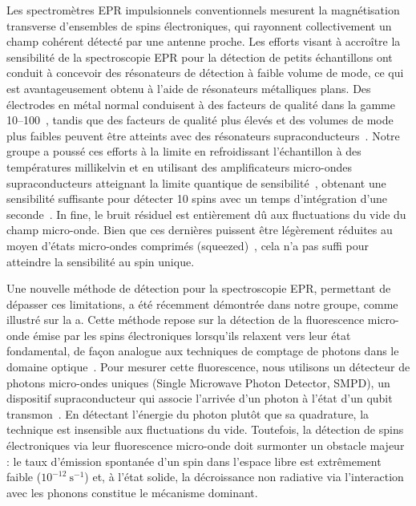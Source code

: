 Les spectromètres EPR impulsionnels conventionnels mesurent la magnétisation transverse d'ensembles de spins électroniques, qui rayonnent collectivement un champ cohérent détecté par une antenne proche. Les efforts visant à accroître la sensibilité de la spectroscopie EPR pour la détection de petits échantillons ont conduit à concevoir des résonateurs de détection à faible volume de mode, ce qui est avantageusement obtenu à l'aide de résonateurs métalliques plans. Des électrodes en métal normal conduisent à des facteurs de qualité dans la gamme 10--100~, tandis que des facteurs de qualité plus élevés et des volumes de mode plus faibles peuvent être atteints avec des résonateurs supraconducteurs~. Notre groupe a poussé ces efforts à la limite en refroidissant l'échantillon à des températures millikelvin et en utilisant des amplificateurs micro-ondes supraconducteurs atteignant la limite quantique de sensibilité~, obtenant une sensibilité suffisante pour détecter 10 spins avec un temps d'intégration d'une seconde~. In fine, le bruit résiduel est entièrement dû aux fluctuations du vide du champ micro-onde. Bien que ces dernières puissent être légèrement réduites au moyen d'états micro-ondes comprimés (squeezed)~, cela n'a pas suffi pour atteindre la sensibilité au spin unique.

Une nouvelle méthode de détection pour la spectroscopie EPR, permettant de dépasser ces limitations, a été récemment démontrée dans notre groupe, comme illustré sur la a. Cette méthode repose sur la détection de la fluorescence micro-onde émise par les spins électroniques lorsqu'ils relaxent vers leur état fondamental, de façon analogue aux techniques de comptage de photons dans le domaine optique~. Pour mesurer cette fluorescence, nous utilisons un détecteur de photons micro-ondes uniques (Single Microwave Photon Detector, SMPD), un dispositif supraconducteur qui associe l'arrivée d'un photon à l'état d'un qubit transmon~. En détectant l'énergie du photon plutôt que sa quadrature, la technique est insensible aux fluctuations du vide. Toutefois, la détection de spins électroniques via leur fluorescence micro-onde doit surmonter un obstacle majeur : le taux d'émission spontanée d'un spin dans l'espace libre est extrêmement faible ($10^{-12}~\mathrm{s}^{-1}$) et, à l'état solide, la décroissance non radiative via l'interaction avec les phonons constitue le mécanisme dominant.

